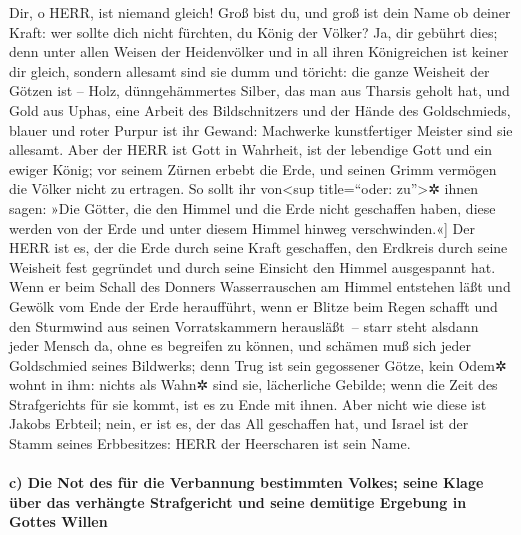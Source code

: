 Dir, o HERR, ist niemand gleich! Groß bist du, und groß
ist dein Name ob deiner Kraft: wer sollte dich nicht
fürchten, du König der Völker? Ja, dir gebührt dies; denn unter allen
Weisen der Heidenvölker und in all ihren Königreichen ist keiner dir
gleich, sondern allesamt sind sie dumm und töricht: die
ganze Weisheit der Götzen ist -- Holz, dünngehämmertes
Silber, das man aus Tharsis geholt hat, und Gold aus Uphas, eine Arbeit
des Bildschnitzers und der Hände des Goldschmieds, blauer und roter
Purpur ist ihr Gewand: Machwerke kunstfertiger Meister sind sie
allesamt. Aber der HERR ist Gott in Wahrheit, ist der
lebendige Gott und ein ewiger König; vor seinem Zürnen erbebt die Erde,
und seinen Grimm vermögen die Völker nicht zu ertragen.
\bibleverse{11}{[}So sollt ihr von\textless sup title=``oder:
zu''\textgreater✲ ihnen sagen: »Die Götter, die den Himmel und die Erde
nicht geschaffen haben, diese werden von der Erde und unter diesem
Himmel hinweg verschwinden.«{]} Der HERR ist es, der die
Erde durch seine Kraft geschaffen, den Erdkreis durch seine Weisheit
fest gegründet und durch seine Einsicht den Himmel ausgespannt hat.
Wenn er beim Schall des Donners Wasserrauschen am Himmel
entstehen läßt und Gewölk vom Ende der Erde heraufführt, wenn er Blitze
beim Regen schafft und den Sturmwind aus seinen Vorratskammern
herausläßt~-- starr steht alsdann jeder Mensch da, ohne
es begreifen zu können, und schämen muß sich jeder Goldschmied seines
Bildwerks; denn Trug ist sein gegossener Götze, kein Odem✲ wohnt in ihm:
nichts als Wahn✲ sind sie, lächerliche Gebilde; wenn die
Zeit des Strafgerichts für sie kommt, ist es zu Ende mit ihnen.
Aber nicht wie diese ist Jakobs Erbteil; nein, er ist es,
der das All geschaffen hat, und Israel ist der Stamm seines Erbbesitzes:
HERR der Heerscharen ist sein Name.

\hypertarget{c-die-not-des-fuxfcr-die-verbannung-bestimmten-volkes-seine-klage-uxfcber-das-verhuxe4ngte-strafgericht-und-seine-demuxfctige-ergebung-in-gottes-willen}{%
\paragraph{c) Die Not des für die Verbannung bestimmten Volkes; seine
Klage über das verhängte Strafgericht und seine demütige Ergebung in
Gottes
Willen}\label{c-die-not-des-fuxfcr-die-verbannung-bestimmten-volkes-seine-klage-uxfcber-das-verhuxe4ngte-strafgericht-und-seine-demuxfctige-ergebung-in-gottes-willen}}

